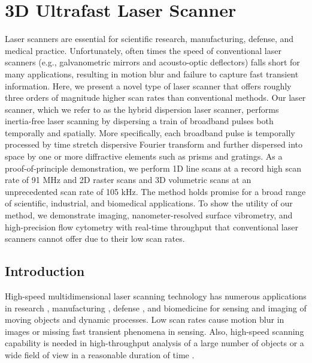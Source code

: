 \chapter{3D Ultrafast Laser Scanner}

Laser scanners are essential for scientific research, manufacturing, defense, and medical practice. Unfortunately, often times the speed of conventional laser scanners (e.g., galvanometric mirrors and acousto-optic deflectors) falls short for many applications, resulting in motion blur and failure to capture fast transient information. Here, we present a novel type of laser scanner that offers roughly three orders of magnitude higher scan rates than conventional methods. Our laser scanner, which we refer to as the hybrid dispersion laser scanner, performs inertia-free laser scanning by dispersing a train of broadband pulses both temporally and spatially. More specifically, each broadband pulse is temporally processed by time stretch dispersive Fourier transform and further dispersed into space by one or more diffractive elements such as prisms and gratings. As a proof-of-principle demonstration, we perform 1D line scans at a record high scan rate of 91 MHz and 2D raster scans and 3D volumetric scans at an unprecedented scan rate of 105 kHz. The method holds promise for a broad range of scientific, industrial, and biomedical applications. To show the utility of our method, we demonstrate imaging, nanometer-resolved surface vibrometry, and high-precision flow cytometry with real-time throughput that conventional laser scanners cannot offer due to their low scan rates.

\section{Introduction}

High-speed multidimensional laser scanning technology has numerous applications in research \cite{marshall2011handbook,fujii2005laser,dotson2003fundamentals,popescu2006optical,gobel2006imaging,pawley2010handbook,denk1990two,wandinger2005lidar}, manufacturing \cite{marshall2011handbook,fujii2005laser,dotson2003fundamentals,schwarz2010mapping,sinha2010vibration,pelesko2002modeling,osten2006optical,horn1986robot}, defense \cite{marshall2011handbook,fujii2005laser,schwarz2010mapping,sinha2010vibration,horn1986robot}, and biomedicine\cite{marshall2011handbook, popescu2006optical,gobel2006imaging,pawley2010handbook,denk1990two,hoffman2006confocal,tarnok2002clinical,vacca2009laser} for sensing and imaging of moving objects and dynamic processes. Low scan rates cause motion blur in images or missing fast transient phenomena in sensing. Also, high-speed scanning capability is needed in high-throughput analysis of a large number of objects or a wide field of view in a reasonable duration of time \cite{marshall2011handbook,fujii2005laser,dotson2003fundamentals,wandinger2005lidar,horn1986robot,hoffman2006confocal,tarnok2002clinical,vacca2009laser,mahjoubfar2011high}.

